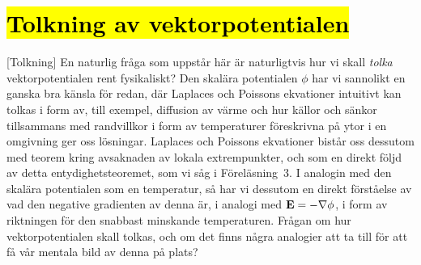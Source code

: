 {{{\section{{\hl{Tolkning av vektorpotentialen}}}
[Tolkning]
En naturlig fr{\aa}ga som uppst{\aa}r h{\"a}r {\"a}r naturligtvis hur vi skall
{\it tolka} vektorpotentialen rent fysika\-liskt? Den skal{\"a}ra potentialen
$\phi$ har vi sannolikt en ganska bra k{\"a}nsla f{\"o}r redan, d{\"a}r
Laplaces och Poissons ekvationer intuitivt kan tolkas i form av, till exempel,
diffusion av v{\"a}rme och hur k{\"a}llor och s{\"a}nkor tillsammans med
randvillkor i form av temperaturer f{\"o}reskrivna p{\aa} ytor i en omgivning
ger oss l{\"o}sningar.
Laplaces och Poissons ekvationer bist{\aa}r oss dessutom med teorem kring
avsaknaden av lokala extrempunkter, och som en direkt f{\"o}ljd av detta
entydighetsteoremet, som vi s{\aa}g i F{\"o}rel{\"a}sning~3.
I analogin med den skal{\"a}ra potentialen som en temperatur, s{\aa} har vi
dessutom en direkt f{\"o}rst{\aa}else av vad den negative gradienten av denna
{\"a}r, i analogi med ${\bf E}=-\nabla\phi$, i form av riktningen f{\"o}r den
snabbast minskande temperaturen.
Fr{\aa}gan om hur vektorpotentialen skall tolkas, och om det finns n{\aa}gra
analogier att ta till f{\"o}r att f{\aa} v{\aa}r mentala bild av denna p{\aa}
plats?

}}}
